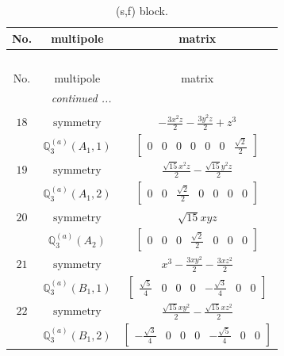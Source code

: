 \documentclass[fleqn,8pt,landscape]{jsarticle}
\begin{document}
\begin{longtable}{ccc}
\caption{(s,f) block.}
 \\
 \hline \hline
No. & multipole & matrix \\ \hline \endfirsthead

\multicolumn{2}{l}{\tablename\ \thetable{}} \\
 \hline \hline
No. & multipole & matrix \\ \hline \endhead

 \hline \hline
\multicolumn{2}{r}{\footnotesize\it continued ...} \\ \endfoot

 \hline \hline
\multicolumn{2}{r}{} \\ \endlastfoot

$ 18 $ & $ \text{symmetry} $ & $ - \frac{3 x^{2} z}{2} - \frac{3 y^{2} z}{2} + z^{3} $ \\
$  $ & $ \mathbb{Q}_{3}^{(a)}(A_{1},1) $ & $ \begin{bmatrix} 0 & 0 & 0 & 0 & 0 & 0 & \frac{\sqrt{2}}{2} \end{bmatrix} $ \\ \hline
$ 19 $ & $ \text{symmetry} $ & $ \frac{\sqrt{15} x^{2} z}{2} - \frac{\sqrt{15} y^{2} z}{2} $ \\
$  $ & $ \mathbb{Q}_{3}^{(a)}(A_{1},2) $ & $ \begin{bmatrix} 0 & 0 & \frac{\sqrt{2}}{2} & 0 & 0 & 0 & 0 \end{bmatrix} $ \\ \hline
$ 20 $ & $ \text{symmetry} $ & $ \sqrt{15} x y z $ \\
$  $ & $ \mathbb{Q}_{3}^{(a)}(A_{2}) $ & $ \begin{bmatrix} 0 & 0 & 0 & \frac{\sqrt{2}}{2} & 0 & 0 & 0 \end{bmatrix} $ \\ \hline
$ 21 $ & $ \text{symmetry} $ & $ x^{3} - \frac{3 x y^{2}}{2} - \frac{3 x z^{2}}{2} $ \\
$  $ & $ \mathbb{Q}_{3}^{(a)}(B_{1},1) $ & $ \begin{bmatrix} \frac{\sqrt{5}}{4} & 0 & 0 & 0 & - \frac{\sqrt{3}}{4} & 0 & 0 \end{bmatrix} $ \\ \hline
$ 22 $ & $ \text{symmetry} $ & $ \frac{\sqrt{15} x y^{2}}{2} - \frac{\sqrt{15} x z^{2}}{2} $ \\
$  $ & $ \mathbb{Q}_{3}^{(a)}(B_{1},2) $ & $ \begin{bmatrix} - \frac{\sqrt{3}}{4} & 0 & 0 & 0 & - \frac{\sqrt{5}}{4} & 0 & 0 \end{bmatrix} $ \\ \hline

\end{longtable}
\end{document}
